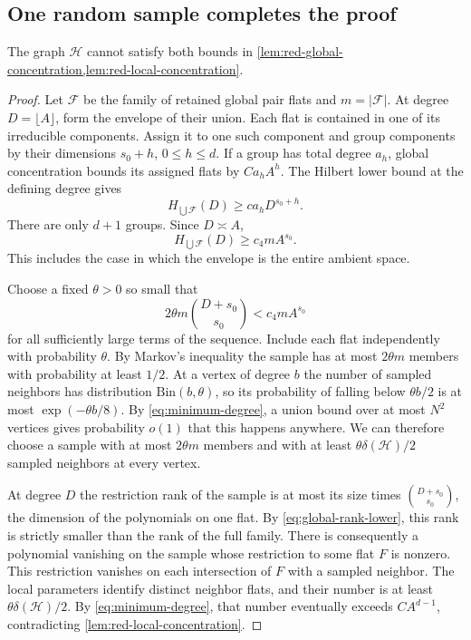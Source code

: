 \subsection{One random sample completes the proof}

\begin{proposition}\label{prop:red-main-contradiction}
The graph $\mathcal{H}$ cannot satisfy both bounds in \cref{lem:red-global-concentration,lem:red-local-concentration}.
\end{proposition}

\begin{proof}
Let $\mathcal{F}$ be the family of retained global pair flats and $m=|\mathcal{F}|$. At degree $D=\lfloor A\rfloor$, form the envelope of their union. Each flat is contained in one of its irreducible components. Assign it to one such component and group components by their dimensions $s_0+h$, $0\le h\le d$. If a group has total degree $a_h$, global concentration bounds its assigned flats by $C a_h A^h$. The Hilbert lower bound at the defining degree gives
\[
 H_{\bigcup\mathcal{F}}(D)
 \ge c a_hD^{s_0+h}.
\]
There are only $d+1$ groups. Since $D\asymp A$,
\begin{equation}\label{eq:global-rank-lower}
 H_{\bigcup\mathcal{F}}(D)\ge c_4mA^{s_0}.
\end{equation}
This includes the case in which the envelope is the entire ambient space.

Choose a fixed $\theta>0$ so small that
\[
 2\theta m\binom{D+s_0}{s_0}<c_4mA^{s_0}
\]
for all sufficiently large terms of the sequence. Include each flat independently with probability $\theta$. By Markov's inequality the sample has at most $2\theta m$ members with probability at least $1/2$. At a vertex of degree $b$ the number of sampled neighbors has distribution $\mathrm{Bin}(b,\theta)$, so its probability of falling below $\theta b/2$ is at most $\exp(-\theta b/8)$. By \eqref{eq:minimum-degree}, a union bound over at most $N^2$ vertices gives probability $o(1)$ that this happens anywhere. We can therefore choose a sample with at most $2\theta m$ members and with at least $\theta\delta(\mathcal H)/2$ sampled neighbors at every vertex.

At degree $D$ the restriction rank of the sample is at most its size times $\binom{D+s_0}{s_0}$, the dimension of the polynomials on one flat. By \eqref{eq:global-rank-lower}, this rank is strictly smaller than the rank of the full family. There is consequently a polynomial vanishing on the sample whose restriction to some flat $F$ is nonzero. This restriction vanishes on each intersection of $F$ with a sampled neighbor. The local parameters identify distinct neighbor flats, and their number is at least $\theta\delta(\mathcal H)/2$. By \eqref{eq:minimum-degree}, that number eventually exceeds $C A^{d-1}$, contradicting \cref{lem:red-local-concentration}.
\end{proof}

